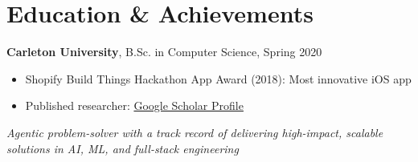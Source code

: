 \documentclass[9pt]{article}
\begin{document}
\section*{Education \& Achievements}
\textbf{Carleton University}, B.Sc. in Computer Science, Spring 2020
\begin{itemize}
    \setlength\itemsep{0em}
    \item Shopify Build Things Hackathon App Award (2018): Most innovative iOS app
    \item Published researcher: \href{https://scholar.google.ca/citations?user=zFDREhgAAAAJ\&hl=en}{Google Scholar Profile}
\end{itemize}

\vspace{-0.5em}
\begin{center}
    \textit{Agentic problem-solver with a track record of delivering high-impact, scalable solutions in AI, ML, and full-stack engineering}
\end{center}
\end{document}
